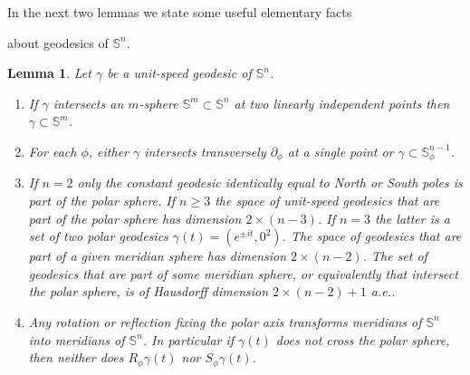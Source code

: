 \documentclass[11pt,a4paper,times]{amsart}
\theoremstyle{plain}
\newtheorem{lemma}[thm]{Lemma}
\theoremstyle{definition}
\numberwithin{equation}{section}
\newcommand{\Se}{\mathbb{S}}
\begin{document}
In the next two lemmas we state some useful elementary facts {about geodesics of $\Se^{n}$.

\begin{lemma}\label{elementar}
 Let $\gamma$ be a unit-speed geodesic of $\Se^n$.
\begin{enumerate}[{\rm 1)}]
\item If $\gamma$ intersects an $m$-sphere $\Se^m\subset \Se^n$ at two linearly independent points then $\gamma\subset \Se^m$.\\[-3mm]
 \item For each $\phi$, either $\gamma$ intersects transversely $\partial_{\phi}$ at a single point or $\gamma\subset \Se^{n-1}_{\phi}$.\\[-3mm]
 \item If $n=2$ only the constant geodesic identically equal to North or South poles is part of the polar sphere.
If $n\geq 3$ the space of unit-speed geodesics that are part of the polar sphere has dimension $2\times (n-3)$.
If $n=3$ the latter is a set of two polar geodesics $\gamma(t)=(e^{\pm it}, 0^2)$.
The space of geodesics that are part of a given meridian sphere has dimension $2\times(n-2)$.
The set of geodesics that are part of some meridian sphere, or equivalently that intersect the polar sphere, is of Hausdorff dimension { $2\times (n-2)+1$ a.e.}.\\[-3mm]
\item Any rotation or reflection fixing the polar axis transforms meridians of $\Se^n$ into meridians of $\Se^n$.
In particular if $\gamma(t)$ does not cross the polar sphere, then neither does $R_{\phi}\gamma(t)$ nor $S_{\phi}\gamma(t)$.
 \end{enumerate}
\end{lemma}

}
\end{document}

